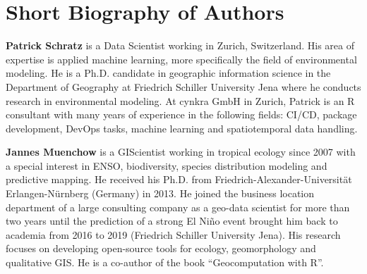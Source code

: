 \documentclass[remotesensing,article,submit,moreauthors,pdftex]{Definitions/mdpi}
\begin{document}
\section*{Short Biography of Authors}
\bio
{}
{\textbf{Patrick Schratz} is a Data Scientist working in Zurich, Switzerland.
	His area of expertise is applied machine learning, more specifically the field of environmental modeling.
	He is a Ph.D. candidate in geographic information science in the Department of Geography at Friedrich Schiller University Jena where he conducts research in environmental modeling.
	At cynkra GmbH in Zurich, Patrick is an R consultant with many years of experience in the following fields: CI/CD, package development, DevOps tasks, machine learning and spatiotemporal data handling.}

\bio
{}
{\textbf{Jannes Muenchow} is a GIScientist working in tropical ecology since 2007 with a special interest in ENSO, biodiversity, species distribution modeling and predictive mapping.
	He received his Ph.D. from Friedrich-Alexander-Universität Erlangen-Nürnberg (Germany) in 2013.
	He joined the business location department of a large consulting company as a geo-data scientist for more than two years until the prediction of a strong El Niño event brought him back to academia from 2016 to 2019 (Friedrich Schiller University Jena).
	His research focuses on developing open-source tools for ecology, geomorphology and qualitative GIS.
	He is a co-author of the book ``Geocomputation with R''.}
\end{document}
